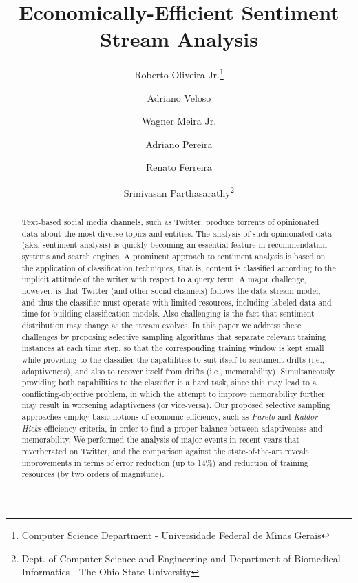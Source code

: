 \documentclass[twoside,leqno,twocolumn]{article}
\begin{document}

\title{Economically-Efficient Sentiment Stream Analysis}
\newcommand*\samethanks[1][\value{footnote}]{\footnotemark[#1]}
\author{Roberto Oliveira Jr.\thanks{Computer Science Department - Universidade Federal de Minas Gerais}
\and
Adriano Veloso \samethanks
\and
Wagner Meira Jr. \samethanks
\and
Adriano Pereira \samethanks
\and
Renato Ferreira \samethanks \\
\and 
Srinivasan Parthasarathy\thanks{Dept. of Computer Science and Engineering and Department of Biomedical Informatics - The Ohio-State University}}
\date{}

\maketitle

 

\begin{abstract}
Text-based social media channels, such as Twitter, produce
torrents of opinionated data about the most diverse topics and entities.
The analysis of such opinionated data (aka. sentiment analysis) is quickly becoming an essential feature in recommendation systems
and search engines.
A prominent approach to sentiment analysis is based on the application of classification techniques, that is,
content is classified according to
the implicit attitude of the writer with respect to a query term.
A major challenge, however, is that Twitter (and other social channels)
follows the data stream model, and thus the classifier must operate
with limited resources, including labeled data and time for building classification models. Also challenging is the fact that
sentiment distribution may change as the stream evolves.
In this paper we address these challenges by proposing selective sampling algorithms that separate relevant training instances 
at each time step, so that the corresponding training window is kept small while providing to the classifier the capabilities to suit 
itself to sentiment drifts (i.e., adaptiveness), and also to recover itself from drifts (i.e., memorability). Simultaneously providing both 
capabilities to the classifier is a hard task, since this may
lead to a conflicting-objective problem, in which the attempt to improve memorability further may result in worsening adaptiveness (or vice-versa). 
Our proposed selective sampling approaches employ basic notions of economic efficiency, such as {\em Pareto} and {\em Kaldor-Hicks} efficiency criteria, 
in order to find a proper balance between adaptiveness and memorability. We performed the analysis of major events in recent years that reverberated on Twitter,
and the comparison against the state-of-the-art reveals improvements in terms of error reduction (up to 14\%) and reduction of training resources (by two orders of magnitude).
\end{abstract}
\end{document}
